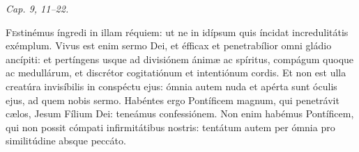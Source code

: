 
{\hfill \textit{Cap. 9, 11–22.}} 

\lettrine{F}{e}stinémus íngredi in illam réquiem: ut ne in idípsum quis íncidat incredulitátis exémplum.
Vivus est enim sermo Dei, et éfficax et penetrabílior omni gládio ancípiti: et pertíngens usque ad divisiónem ánimæ ac spíritus, compágum quoque ac medullárum, et discrétor cogitatiónum et intentiónum cordis.
Et non est ulla creatúra invisíbilis in conspéctu ejus: ómnia autem nuda et apérta sunt óculis ejus, ad quem nobis sermo.
Habéntes ergo Pontíficem magnum, qui penetrávit cælos, Jesum Fílium Dei: teneámus confessiónem.
Non enim habémus Pontíficem, qui non possit cómpati infirmitátibus nostris: tentátum autem per ómnia pro similitúdine absque peccáto.